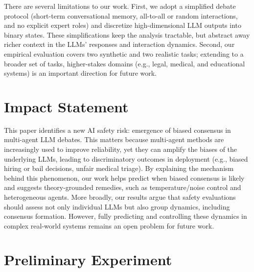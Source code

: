 \documentclass{article}
\theoremstyle{plain}
\theoremstyle{definition}
\theoremstyle{remark}
\begin{document}
There are several limitations to our work. First, we adopt a simplified debate protocol (short-term conversational memory, all-to-all or random interactions, and no explicit expert roles) and discretize high-dimensional LLM outputs into binary states. These simplifications keep the analysis tractable, but abstract away richer context in the LLMs' responses and interaction dynamics. Second, our empirical evaluation covers two synthetic and two realistic tasks; extending to a broader set of tasks, higher-stakes domains (e.g., legal, medical, and educational systems) is an important direction for future work. 



\clearpage


\section*{Impact Statement}
This paper identifies a new AI safety risk: emergence of biased consensus in multi-agent LLM debates. This matters because multi-agent methods are increasingly used to improve reliability, 
yet they can amplify the biases of the underlying LLMs, leading to discriminatory outcomes in deployment (e.g., biased hiring or bail decisions, unfair medical triage). 
By explaining the mechanism behind this phenomenon, our work helps predict when biased consensus is likely and suggests theory-grounded remedies, such as temperature/noise control and heterogeneous agents. More broadly, our results argue that safety evaluations should assess not only individual LLMs but also group dynamics, including consensus formation. However, fully predicting and controlling these dynamics in complex real-world systems remains an open problem for future work. 







\appendix
\onecolumn

\section{Preliminary Experiment}\label{app:preliminary}
\end{document}
